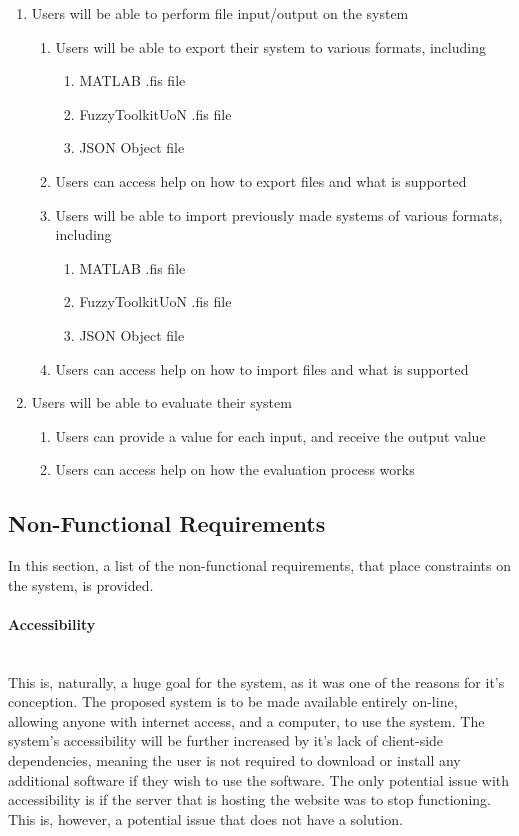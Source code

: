 \begin{enumerate}
\item Users will be able to perform file input/output on the system
	\begin{enumerate}[label*=\arabic*.]
		\item Users will be able to export their system to various formats, including	
		\begin{enumerate}[label*=\arabic*.]			
			\item MATLAB .fis file
			\item FuzzyToolkitUoN .fis file
			\item JSON Object file		
		\end{enumerate}
		\item Users can access help on how to export files and what is supported
		\item Users will be able to import previously made systems of various formats, including
		\begin{enumerate}[label*=\arabic*.]
			\item MATLAB .fis file
			\item FuzzyToolkitUoN .fis file
			\item JSON Object file	
		\end{enumerate}
		\item Users can access help on how to import files and what is supported		
	\end{enumerate}

\item Users will be able to evaluate their system
	\begin{enumerate}[label*=\arabic*.]
		\item Users can provide a value for each input, and receive the output value
		\item Users can access help on how the evaluation process works
	\end{enumerate}	
\end{enumerate}

\subsection{Non-Functional Requirements}
In this section, a list of the non-functional requirements, that place constraints on the system, is provided.

\paragraph{Accessibility}\ \\
This is, naturally, a huge goal for the system, as it was one of the reasons for it's conception. The proposed system is to be made available entirely on-line, allowing anyone with internet access, and a computer, to use the system. The system's accessibility will be further increased by it's lack of client-side dependencies, meaning the user is not required to download or install any additional software if they wish to use the software. The only potential issue with accessibility is if the server that is hosting the website was to stop functioning. This is, however, a potential issue that does not have a solution.

